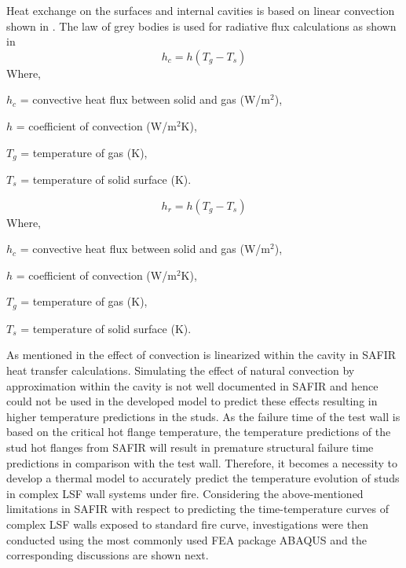 Heat exchange on the surfaces and internal cavities is based on linear convection shown in . The law of grey bodies is used for radiative flux calculations as shown in 
\begin{equation}\label{eq:safir-convection}
	h_c = h\left(T_g - T_s\right)
\end{equation}
Where,
\begin{description}[itemsep=0pt,parsep=0pt]
	\item $h_c$ = convective heat flux between solid and gas (W/m$^2$),
	\item $h$ = coefficient of convection (W/m$^2$K),
	\item $T_g$ = temperature of gas (K),
	\item $T_s$ = temperature of solid surface (K).
\end{description}
\begin{equation}\label{eq:safir-radiation}
	h_r = h\left(T_g - T_s\right)
\end{equation}
Where,
\begin{description}[itemsep=0pt,parsep=0pt]
	\item $h_c$ = convective heat flux between solid and gas (W/m$^2$),
	\item $h$ = coefficient of convection (W/m$^2$K),
	\item $T_g$ = temperature of gas (K),
	\item $T_s$ = temperature of solid surface (K).
\end{description}

As mentioned in  the effect of convection is linearized within the cavity in SAFIR heat transfer calculations. Simulating the effect of natural convection by approximation within the cavity is not well documented in SAFIR and hence could not be used in the developed model to predict these effects resulting in higher temperature predictions in the studs. As the failure time of the test wall is based on the critical hot flange temperature, the temperature predictions of the stud hot flanges from SAFIR will result in premature structural failure time predictions in comparison with the test wall. Therefore, it becomes a necessity to develop a thermal model to accurately predict the temperature evolution of studs in complex LSF wall systems under fire. Considering the above-mentioned limitations in SAFIR with respect to predicting the time-temperature curves of complex LSF walls exposed to standard fire curve, investigations were then conducted using the most commonly used FEA package ABAQUS and the corresponding discussions are shown next.

